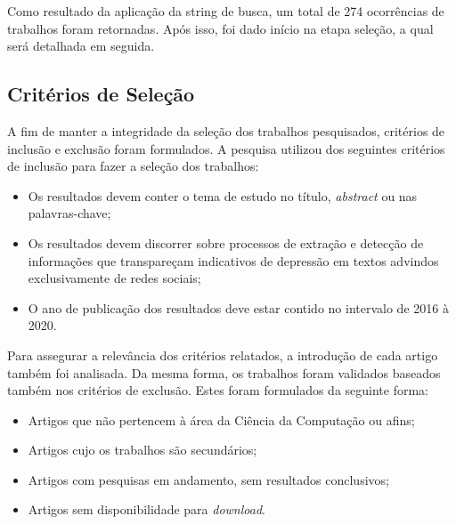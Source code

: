 \documentclass[conference]{IEEEtran}
\begin{document}
Como resultado da aplicação da string de busca, um total de 274 ocorrências de trabalhos foram retornadas. Após isso, foi dado início na etapa seleção, a qual será detalhada em seguida.

\subsection{Critérios de Seleção}
A fim de manter a integridade da seleção dos trabalhos pesquisados, critérios de inclusão e exclusão foram formulados. A pesquisa utilizou dos seguintes critérios de inclusão para fazer a seleção dos trabalhos:

\begin{itemize}
    \item Os resultados devem conter o tema de estudo no título, \textit{abstract} ou nas palavras-chave;
    \item Os resultados devem discorrer sobre processos de extração e detecção de informações que transpareçam indicativos de depressão em textos advindos exclusivamente de redes sociais;
    \item O ano de publicação dos resultados deve estar contido no intervalo de 2016 à 2020.
\end{itemize}

Para assegurar a relevância dos critérios relatados, a introdução de cada artigo também foi analisada. Da mesma forma, os trabalhos foram validados baseados também nos critérios de exclusão. Estes foram formulados da seguinte forma:

\begin{itemize}
    \item Artigos que não pertencem à área da Ciência da Computação ou afins;
    \item Artigos cujo os trabalhos são secundários;
    \item Artigos com pesquisas em andamento, sem resultados conclusivos;
    \item Artigos sem disponibilidade para \textit{download}.
\end{itemize}
\end{document}
